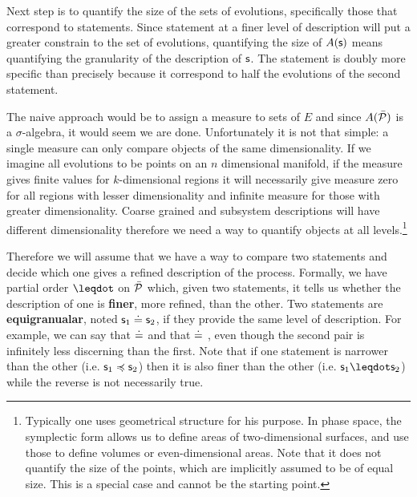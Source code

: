 \documentclass[letterpaper]{article}
\begin{document}
Next step is to quantify the size of the sets of evolutions, specifically those that correspond to statements. Since statement at a finer level of description will put a greater constrain to the set of evolutions, quantifying the size of $A(\stmt)$ means quantifying the granularity of the description of $\stmt$. The statement  is doubly more specific than  precisely because it correspond to half the evolutions of the second statement.

The naive approach would be to assign a measure to sets of $E$ and since $A(\tdomain[P])$ is a $\sigma$-algebra, it would seem we are done. Unfortunately it is not that simple: a single measure can only compare objects of the same dimensionality. If we imagine all evolutions to be points on an $n$ dimensional manifold, if the measure gives finite values for $k$-dimensional regions it will necessarily give measure zero for all regions with lesser dimensionality and infinite measure for those with greater dimensionality. Coarse grained and subsystem descriptions will have different dimensionality therefore we need a way to quantify objects at all levels.\footnote{Typically one uses geometrical structure for his purpose. In phase space, the symplectic form allows us to define areas of two-dimensional surfaces, and use those to define volumes or even-dimensional areas. Note that it does not quantify the size of the points, which are implicitly assumed to be of equal size. This is a special case and cannot be the starting point.}

Therefore we will assume that we have a way to compare two statements and decide which one gives a refined description of the process. Formally, we have partial order $\finer$ on $\tdomain[P]$ which, given two statements, it tells us whether the description of one is \textbf{finer}, more refined, than the other. Two statements are \textbf{equigranualar}, noted $\stmt_1 \eqgran \stmt_2$, if they provide the same level of description. For example, we can say that  $\eqgran$  and that  $\eqgran$ , even though the second pair is infinitely less discerning than the first. Note that if one statement is narrower than the other (i.e. $\stmt_1 \narrower \stmt_2$) then it is also finer than the other (i.e. $\stmt_1 \finer \stmt_2$) while the reverse is not necessarily true. 
\end{document}
